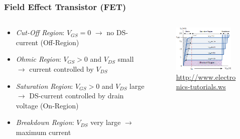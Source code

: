 \documentclass{beamer}
\begin{document}
\begin{frame}\frametitle{Field Effect Transistor (FET)} 
\begin{columns}
\begin{column}{6cm}
\begin{itemize}
\item<1-> \textit{Cut-Off Region}: $V_{GS}=0$ $\rightarrow$ no DS-current \newline(Off-Region)

\item<2-> \textit{Ohmic Region}: $V_{GS}>0$ and $V_{DS}$ small $\rightarrow$ current controlled by $V_{DS}$

\item<3-> \textit{Saturation Region}: $V_{GS}>0$ and $V_{DS}$ large $\rightarrow$ DS-current controlled by drain voltage  \newline(On-Region)

\item<4-> \textit{Breakdown Region}: $V_{DS}$ very large $\rightarrow$ maximum current

\end{itemize}
\end{column}
\begin{column}{5cm}
\begin{figure}[H]
\centering
\includegraphics[width=0.9\textwidth]{kenn_jfet}
\caption{\url{http://www.electronics-tutorials.ws}}%
\end{figure}
\end{column}
\end{columns}
\end{frame}
\end{document}
